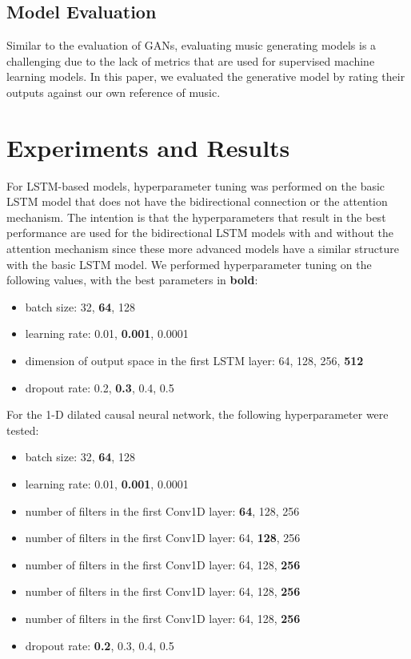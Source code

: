 \documentclass[sigconf,authorversion]{acmart}
\providecommand{\tightlist}{%
  \setlength{\itemsep}{0pt}\setlength{\parskip}{0pt}}
\begin{document}
\subsection{Model Evaluation}

Similar to the evaluation of GANs, evaluating music generating models is a challenging 
due to the lack of metrics that are used for supervised machine learning models.
In this paper, we evaluated the generative model by rating their outputs against our own
reference of music.


\section{Experiments and Results}

For LSTM-based models, hyperparameter tuning was performed on the basic LSTM model 
that does not have the bidirectional connection or the attention mechanism. 
The intention is that the hyperparameters that result in the best performance 
are used for the bidirectional LSTM models with and without the attention mechanism
since these more advanced models have a similar structure with the basic LSTM
model. We performed hyperparameter tuning on the following values, with the 
best parameters in \textbf{bold}:

\begin{itemize}
  \tightlist
  \item batch size: 32, \textbf{64}, 128
  \item learning rate: 0.01, \textbf{0.001}, 0.0001
  \item dimension of output space in the first LSTM layer: 64, 128, 256, \textbf{512} 
  \item dropout rate: 0.2, \textbf{0.3}, 0.4, 0.5
\end{itemize}

For the 1-D dilated causal neural network, the following hyperparameter were tested:

\begin{itemize}
  \tightlist
  \item batch size: 32, \textbf{64}, 128
  \item learning rate: 0.01, \textbf{0.001}, 0.0001
  \item number of filters in the first Conv1D layer: \textbf{64}, 128, 256
  \item number of filters in the first Conv1D layer: 64, \textbf{128}, 256
  \item number of filters in the first Conv1D layer: 64, 128, \textbf{256}
  \item number of filters in the first Conv1D layer: 64, 128, \textbf{256}
  \item number of filters in the first Conv1D layer: 64, 128, \textbf{256}
  \item dropout rate: \textbf{0.2}, 0.3, 0.4, 0.5
\end{itemize}
\end{document}
